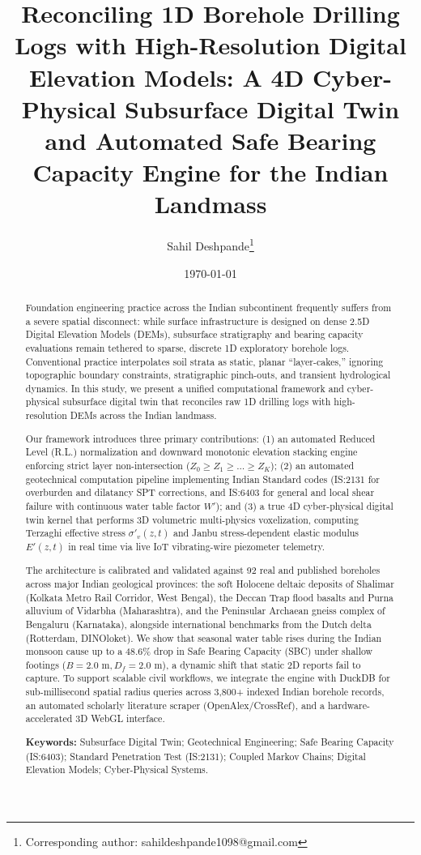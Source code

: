 \documentclass[11pt,a4paper]{article}
\title{\textbf{Reconciling 1D Borehole Drilling Logs with High-Resolution Digital Elevation Models: A 4D Cyber-Physical Subsurface Digital Twin and Automated Safe Bearing Capacity Engine for the Indian Landmass}}
\author[1]{Sahil Deshpande\thanks{Corresponding author: sahildeshpande1098@gmail.com}}
\affil[1]{Geotechnical \& Computational Engineering Researcher}
\date{\today}
\begin{document}
\maketitle

\begin{abstract}
Foundation engineering practice across the Indian subcontinent frequently suffers from a severe spatial disconnect: while surface infrastructure is designed on dense 2.5D Digital Elevation Models (DEMs), subsurface stratigraphy and bearing capacity evaluations remain tethered to sparse, discrete 1D exploratory borehole logs. Conventional practice interpolates soil strata as static, planar ``layer-cakes,'' ignoring topographic boundary constraints, stratigraphic pinch-outs, and transient hydrological dynamics. In this study, we present a unified computational framework and cyber-physical subsurface digital twin that reconciles raw 1D drilling logs with high-resolution DEMs across the Indian landmass. 

Our framework introduces three primary contributions: (1) an automated Reduced Level (R.L.) normalization and downward monotonic elevation stacking engine enforcing strict layer non-intersection ($Z_0 \ge Z_1 \ge \dots \ge Z_K$); (2) an automated geotechnical computation pipeline implementing Indian Standard codes (IS:2131 for overburden and dilatancy SPT corrections, and IS:6403 for general and local shear failure with continuous water table factor $W'$); and (3) a true 4D cyber-physical digital twin kernel that performs 3D volumetric multi-physics voxelization, computing Terzaghi effective stress $\sigma'_v(z, t)$ and Janbu stress-dependent elastic modulus $E'(z, t)$ in real time via live IoT vibrating-wire piezometer telemetry. 

The architecture is calibrated and validated against 92 real and published boreholes across major Indian geological provinces: the soft Holocene deltaic deposits of Shalimar (Kolkata Metro Rail Corridor, West Bengal), the Deccan Trap flood basalts and Purna alluvium of Vidarbha (Maharashtra), and the Peninsular Archaean gneiss complex of Bengaluru (Karnataka), alongside international benchmarks from the Dutch delta (Rotterdam, DINOloket). We show that seasonal water table rises during the Indian monsoon cause up to a 48.6\% drop in Safe Bearing Capacity (SBC) under shallow footings ($B = 2.0\text{ m}, D_f = 2.0\text{ m}$), a dynamic shift that static 2D reports fail to capture. To support scalable civil workflows, we integrate the engine with DuckDB for sub-millisecond spatial radius queries across 3,800+ indexed Indian borehole records, an automated scholarly literature scraper (OpenAlex/CrossRef), and a hardware-accelerated 3D WebGL interface.

\vspace{0.5em}
\noindent\textbf{Keywords:} Subsurface Digital Twin; Geotechnical Engineering; Safe Bearing Capacity (IS:6403); Standard Penetration Test (IS:2131); Coupled Markov Chains; Digital Elevation Models; Cyber-Physical Systems.
\end{abstract}
\end{document}
